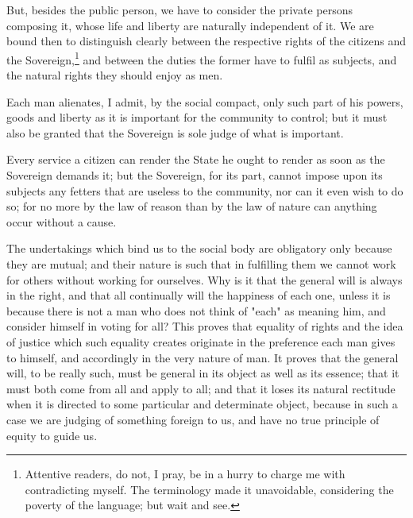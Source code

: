 \documentclass[12pt]{report}
\begin{document}
But, besides the public person, we have to consider the private persons composing it, whose life and liberty are naturally independent of it. We are bound then to distinguish clearly between the respective rights of the citizens and the Sovereign,\footnote{Attentive readers, do not, I pray, be in a hurry to charge me with contradicting myself. The terminology made it unavoidable, considering the poverty of the language; but wait and see.} and between the duties the former have to fulfil as subjects, and the natural rights they should enjoy as men.

Each man alienates, I admit, by the social compact, only such part of his powers, goods and liberty as it is important for the community to control; but it must also be granted that the Sovereign is sole judge of what is important.

Every service a citizen can render the State he ought to render as soon as the Sovereign demands it; but the Sovereign, for its part, cannot impose upon its subjects any fetters that are useless to the community, nor can it even wish to do so; for no more by the law of reason than by the law of nature can anything occur without a cause.

The undertakings which bind us to the social body are obligatory only because they are mutual; and their nature is such that in fulfilling them we cannot work for others without working for ourselves. Why is it that the general will is always in the right, and that all continually will the happiness of each one, unless it is because there is not a man who does not think of "each" as meaning him, and consider himself in voting for all? This proves that equality of rights and the idea of justice which such equality creates originate in the preference each man gives to himself, and accordingly in the very nature of man. It proves that the general will, to be really such, must be general in its object as well as its essence; that it must both come from all and apply to all; and that it loses its natural rectitude when it is directed to some particular and determinate object, because in such a case we are judging of something foreign to us, and have no true principle of equity to guide us.
\end{document}
